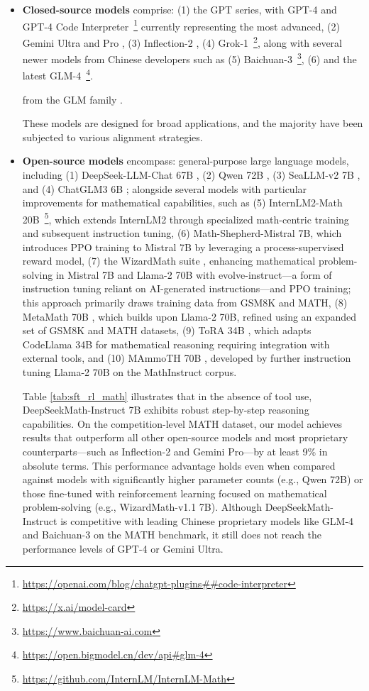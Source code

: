 \begin{itemize}[topsep=0pt]
\begin{itemize}[topsep=0pt]
    \item \textbf{Closed-source models} comprise: (1) the GPT series, with GPT-4 \citep{gpt4} and GPT-4 Code Interpreter~\footnote{\url{https://openai.com/blog/chatgpt-plugins\#\#code-interpreter}} currently representing the most advanced, (2) Gemini Ultra and Pro \citep{gemini}, (3) Inflection-2 \citep{inflection-2}, (4) Grok-1~\footnote{\url{https://x.ai/model-card}}, along with several newer models from Chinese developers such as (5) Baichuan-3~\footnote{\url{https://www.baichuan-ai.com}}, (6) and the latest GLM-4~\footnote{\url{https://open.bigmodel.cn/dev/api\#glm-4}}.

    from the GLM family \citep{glm}.

These models are designed for broad applications, and the majority have been subjected to various alignment strategies. 
    \item \textbf{Open-source models} encompass: general-purpose large language models, including (1) DeepSeek-LLM-Chat 67B \citep{deepseek-llm}, (2) Qwen 72B \citep{qwen}, (3) SeaLLM-v2 7B \citep{seallm}, and (4) ChatGLM3 6B \citep{chatglm3}; alongside several models with particular improvements for mathematical capabilities, such as (5) InternLM2-Math 20B~\footnote{\url{https://github.com/InternLM/InternLM-Math}}, which extends InternLM2 through specialized math-centric training and subsequent instruction tuning, (6) Math-Shepherd-Mistral 7B, which introduces PPO training \citep{schulman2017proximal} to Mistral 7B \citep{mistral} by leveraging a process-supervised reward model, (7) the WizardMath suite \citep{wizardmath}, enhancing mathematical problem-solving in Mistral 7B and Llama-2 70B \citep{llama2} with evolve-instruct—a form of instruction tuning reliant on AI-generated instructions—and PPO training; this approach primarily draws training data from GSM8K and MATH, (8) MetaMath 70B \citep{metamath}, which builds upon Llama-2 70B, refined using an expanded set of GSM8K and MATH datasets, (9) ToRA 34B \cite{tora}, which adapts CodeLlama 34B for mathematical reasoning requiring integration with external tools, and (10) MAmmoTH 70B \citep{MathInstruct}, developed by further instruction tuning Llama-2 70B on the MathInstruct corpus.

Table \ref{tab:sft_rl_math} illustrates that in the absence of tool use, DeepSeekMath-Instruct 7B exhibits robust step-by-step reasoning capabilities. On the competition-level MATH dataset, our model achieves results that outperform all other open-source models and most proprietary counterparts—such as Inflection-2 and Gemini Pro—by at least 9\% in absolute terms. This performance advantage holds even when compared against models with significantly higher parameter counts (e.g., Qwen 72B) or those fine-tuned with reinforcement learning focused on mathematical problem-solving (e.g., WizardMath-v1.1 7B). Although DeepSeekMath-Instruct is competitive with leading Chinese proprietary models like GLM-4 and Baichuan-3 on the MATH benchmark, it still does not reach the performance levels of GPT-4 or Gemini Ultra.


\end{itemize}
\end{itemize}
